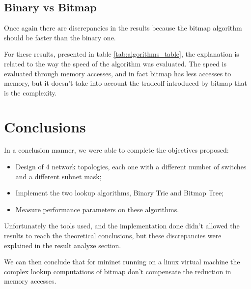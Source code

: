 \documentclass[]{report}
\begin{document}
\section{Binary vs Bitmap}
	Once again there are discrepancies in the results because the bitmap algorithm should be faster than the binary one. 
	
For these results, presented in table \ref{tab:algorithms_table}, the explanation is related to the way the speed of the algorithm was evaluated. The speed is evaluated through memory accesses, and in fact bitmap has less accesses to memory, but it doesn’t take into account the tradeoff introduced by bitmap that is the complexity.

 

\begin{minipage}{\linewidth}%
\label{tab:algorithms_table}
\end{minipage}


\chapter{Conclusions}
In a conclusion manner, we were able to complete the objectives proposed:
\begin{itemize}
\item Design of 4 network topologies, each one with a different number of switches and a different subnet mask;
\item Implement the two lookup algorithms, Binary Trie and Bitmap Tree;
\item Measure performance parameters on these algorithms.
\end{itemize}
Unfortunately the tools used, and the implementation done didn’t allowed the results to reach the theoretical conclusions, but these discrepancies were explained in the result analyze section. 

We can then conclude that for mininet running on a linux virtual machine the complex lookup computations of bitmap don’t compensate the reduction in memory accesses.
\end{document}
